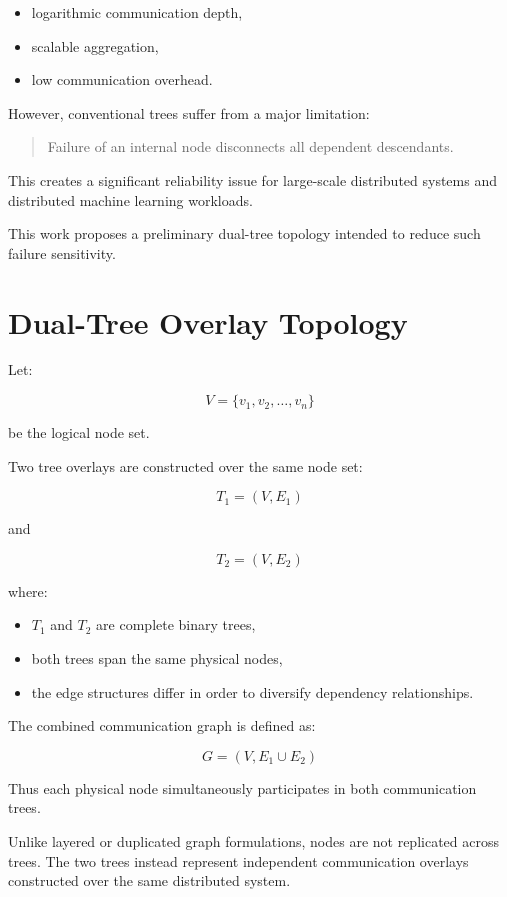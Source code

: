 \documentclass[11pt]{article}
\begin{document}
\begin{itemize}
    \item logarithmic communication depth,
    \item scalable aggregation,
    \item low communication overhead.
\end{itemize}

However, conventional trees suffer from a major limitation:

\begin{quote}
Failure of an internal node disconnects all dependent descendants.
\end{quote}

This creates a significant reliability issue for large-scale distributed systems and distributed machine learning workloads.

This work proposes a preliminary dual-tree topology intended to reduce such failure sensitivity.

\section{Dual-Tree Overlay Topology}

Let:

\[
V = \{v_1,v_2,\dots,v_n\}
\]

be the logical node set.

Two tree overlays are constructed over the same node set:

\[
T_1 = (V,E_1)
\]

and

\[
T_2 = (V,E_2)
\]

where:
\begin{itemize}
    \item \(T_1\) and \(T_2\) are complete binary trees,
    \item both trees span the same physical nodes,
    \item the edge structures differ in order to diversify dependency relationships.
\end{itemize}

The combined communication graph is defined as:

\[
G=(V,E_1\cup E_2)
\]

Thus each physical node simultaneously participates in both communication trees.

Unlike layered or duplicated graph formulations, nodes are not replicated across trees. The two trees instead represent independent communication overlays constructed over the same distributed system.
\end{document}
